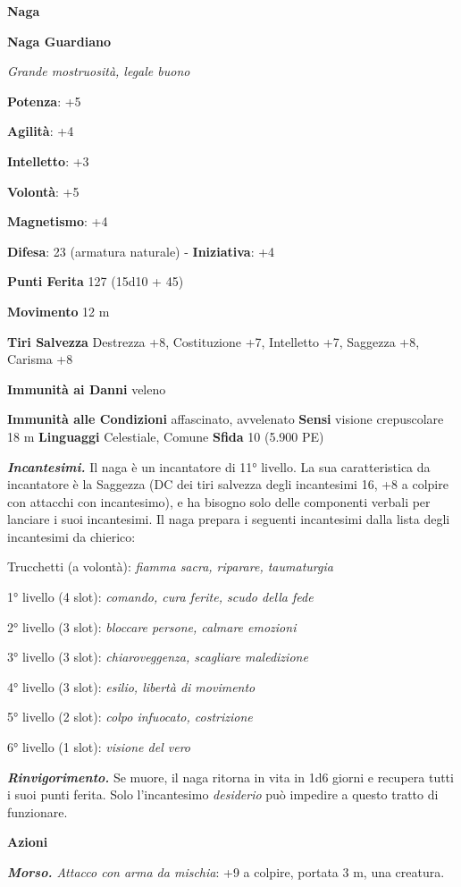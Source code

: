 \begin{multicols}{2}
\textbf{Naga}

\textbf{Naga Guardiano}

\emph{Grande mostruosità, legale buono}

\textbf{Potenza}: +5

\textbf{Agilità}: +4

\textbf{Intelletto}: +3

\textbf{Volontà}: +5

\textbf{Magnetismo}: +4

\textbf{Difesa}: 23 (armatura naturale) - \textbf{Iniziativa}: +4

\textbf{Punti Ferita} 127 (15d10 + 45)

\textbf{Movimento} 12 m

\textbf{Tiri Salvezza} Destrezza +8, Costituzione +7, Intelletto +7,
Saggezza +8, Carisma +8

\textbf{Immunità ai Danni} veleno

\textbf{Immunità alle Condizioni} affascinato, avvelenato \textbf{Sensi}
visione crepuscolare 18 m \textbf{Linguaggi} Celestiale,
Comune \textbf{Sfida} 10 (5.900 PE)

\emph{\textbf{Incantesimi.}} Il naga è un incantatore di 11° livello. La
sua caratteristica da incantatore è la Saggezza (DC dei tiri salvezza
degli incantesimi 16, +8 a colpire con attacchi con incantesimo), e ha
bisogno solo delle componenti verbali per lanciare i suoi incantesimi.
Il naga prepara i seguenti incantesimi dalla lista degli incantesimi da
chierico:

Trucchetti (a volontà): \emph{fiamma sacra, riparare, taumaturgia}

1° livello (4 slot): \emph{comando, cura ferite, scudo della fede}

2° livello (3 slot): \emph{bloccare persone, calmare emozioni}

3° livello (3 slot): \emph{chiaroveggenza, scagliare maledizione}

4° livello (3 slot): \emph{esilio, libertà di movimento}

5° livello (2 slot): \emph{colpo infuocato, costrizione}

6° livello (1 slot): \emph{visione del vero}

\emph{\textbf{Rinvigorimento.}} Se muore, il naga ritorna in vita in 1d6
giorni e recupera tutti i suoi punti ferita. Solo l'incantesimo
\emph{desiderio} può impedire a questo tratto di funzionare.

\textbf{Azioni}

\emph{\textbf{Morso.} Attacco con arma da mischia}: +9 a colpire,
portata 3 m, una creatura.


\end{multicols}
